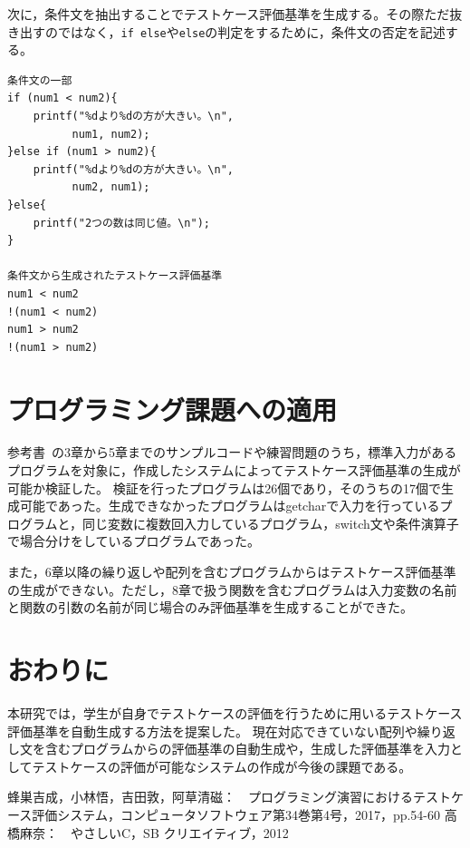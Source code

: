 \documentclass[10pt]{tpu-abst}
\begin{document}
次に，条件文を抽出することでテストケース評価基準を生成する。その際ただ抜き出すのではなく，{\tt if else}や{\tt else}の判定をするために，条件文の否定を記述する。 
\begin{lstlisting}
条件文の一部
if (num1 < num2){
	printf("%dより%dの方が大きい。\n", 
		  num1, num2);
}else if (num1 > num2){
	printf("%dより%dの方が大きい。\n",
		  num2, num1);
}else{
	printf("2つの数は同じ値。\n");
}

条件文から生成されたテストケース評価基準
num1 < num2
!(num1 < num2)
num1 > num2
!(num1 > num2)
\end{lstlisting}
\section{プログラミング課題への適用}
参考書~\cite{b1}の3章から5章までのサンプルコードや練習問題のうち，標準入力があるプログラムを対象に，作成したシステムによってテストケース評価基準の生成が可能か検証した。
検証を行ったプログラムは26個であり，そのうちの17個で生成可能であった。生成できなかったプログラムはgetcharで入力を行っているプログラムと，同じ変数に複数回入力しているプログラム，switch文や条件演算子で場合分けをしているプログラムであった。

また，6章以降の繰り返しや配列を含むプログラムからはテストケース評価基準の生成ができない。ただし，8章で扱う関数を含むプログラムは入力変数の名前と関数の引数の名前が同じ場合のみ評価基準を生成することができた。

\section{おわりに}
本研究では，学生が自身でテストケースの評価を行うために用いるテストケース評価基準を自動生成する方法を提案した。
現在対応できていない配列や繰り返し文を含むプログラムからの評価基準の自動生成や，生成した評価基準を入力としてテストケースの評価が可能なシステムの作成が今後の課題である。

\begin{thebibliography}{2}
  {\small 蜂巣吉成，小林悟，吉田敦，阿草清磁：　プログラミング演習におけるテストケース評価システム，コンピュータソフトウェア第34巻第4号，2017，pp.54-60}
  {\small 高橋麻奈：　やさしいC，SB クリエイティブ，2012}
\end{thebibliography}
%
\end{document}
